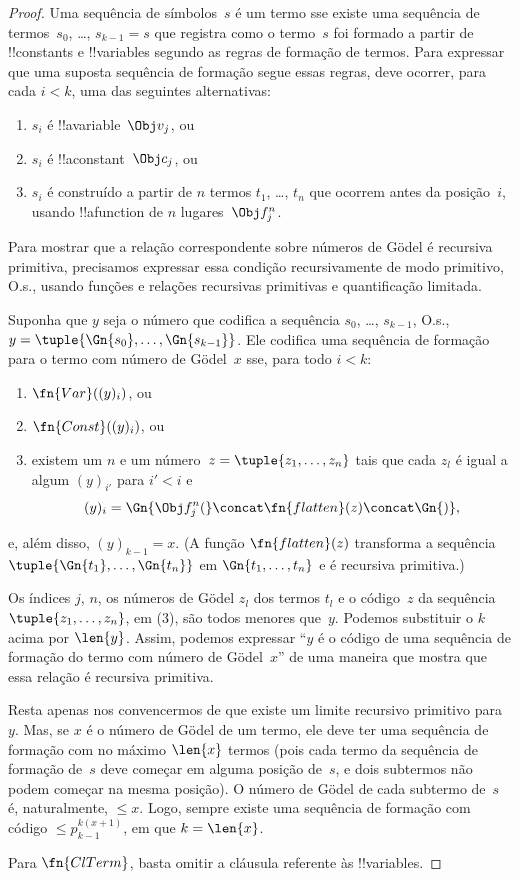 \documentclass[../../../include/open-logic-section]{subfiles}
\begin{document}
\begin{proof}
Uma sequência de símbolos~$s$ é um termo sse existe uma sequência de
termos~$s_0$, \dots, $s_{k-1} = s$ que registra como o termo~$s$ foi
formado a partir de !!{constant}s e !!{variable}s segundo as regras de
formação de termos. Para expressar que uma suposta sequência de
formação segue essas regras, deve ocorrer, para cada $i < k$, uma das
seguintes alternativas:
\begin{enumerate}
\item $s_i$ é !!a{variable}~$\Obj v_j$, ou
\item $s_i$ é !!a{constant}~$\Obj c_j$, ou
\item $s_i$ é construído a partir de $n$ termos $t_1$, \dots, $t_n$
  que ocorrem antes da posição~$i$, usando !!a{function} de $n$
  lugares~$\Obj f^n_j$.
\end{enumerate}
Para mostrar que a relação correspondente sobre números de G\"odel é
recursiva primitiva, precisamos expressar essa condição recursivamente
de modo primitivo, O.s.\@, usando funções e relações recursivas
primitivas e quantificação limitada.

Suponha que $y$ seja o número que codifica a sequência $s_0$, \dots,
$s_{k-1}$, O.s.\@, $y = \tuple{\Gn{s_0}, \dots, \Gn{s_{k-1}}}$. Ele
codifica uma sequência de formação para o termo com número de
G\"odel~$x$ sse, para todo $i < k$:
\begin{enumerate}
\item $\fn{Var}((y)_i)$, ou
\item $\fn{Const}((y)_i)$, ou
\item existem um $n$ e um número~$z = \tuple{z_1, \dots, z_n}$ tais
  que cada $z_l$ é igual a algum $(y)_{i'}$ para $i' < i$ e
\[
(y)_i = \Gn{\Obj f^n_j(} \concat \fn{flatten}(z) \concat \Gn{)},
\]
\end{enumerate}
e, além disso, $(y)_{k-1} = x$. (A função $\fn{flatten}(z)$ transforma
a sequência $\tuple{\Gn{t_1}, \dots, \Gn{t_n}}$ em $\Gn{t_1, \dots,
  t_n}$ e é recursiva primitiva.)

Os índices $j$, $n$, os números de G\"odel $z_l$ dos termos $t_l$ e o
código~$z$ da sequência~$\tuple{z_1, \dots, z_n}$, em (3), são todos
menores que~$y$. Podemos substituir o $k$ acima por $\len{y}$. Assim,
podemos expressar ``$y$ é o código de uma sequência de formação do
termo com número de G\"odel~$x$'' de uma maneira que mostra que essa
relação é recursiva primitiva.

Resta apenas nos convencermos de que existe um limite recursivo
primitivo para~$y$. Mas, se $x$ é o número de G\"odel de um termo, ele
deve ter uma sequência de formação com no máximo $\len{x}$ termos
(pois cada termo da sequência de formação de~$s$ deve começar em alguma
posição de~$s$, e dois subtermos não podem começar na mesma posição).
O número de G\"odel de cada subtermo de~$s$ é, naturalmente, $\le x$.
Logo, sempre existe uma sequência de formação com código
$\le p_{k-1}^{k(x+1)}$, em que $k=\len{x}$.

Para $\fn{ClTerm}$, basta omitir a cláusula referente às !!{variable}s.
\end{proof}
\end{document}
